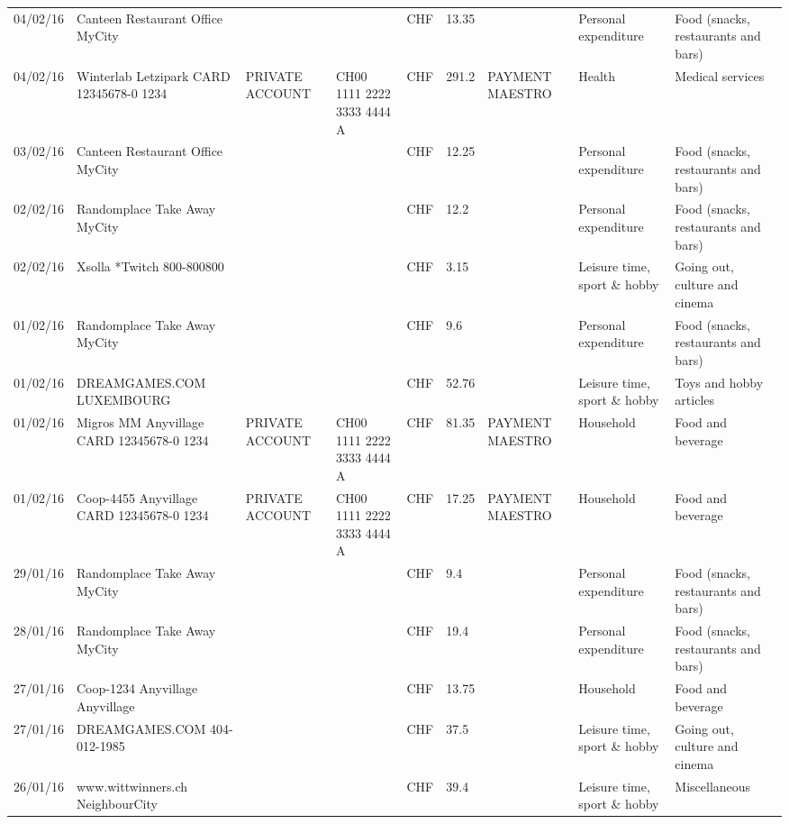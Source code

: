 \begin{landscape}
\begin{adjustwidth}{-2cm}{-2cm}
\begin{tiny}
\begin{longtable}{lp{4cm}llllp{3cm}ll}
		04/02/16 & Canteen Restaurant Office      MyCity &       &       & CHF   & 13.35 &       & Personal expenditure & Food (snacks, restaurants and bars) \\
		04/02/16 & Winterlab Letzipark CARD 12345678-0 1234 & PRIVATE ACCOUNT & CH00 1111 2222 3333 4444 A & CHF   & 291.2 & PAYMENT MAESTRO & Health & Medical services  \\
		03/02/16 & Canteen Restaurant Office      MyCity &       &       & CHF   & 12.25 &       & Personal expenditure & Food (snacks, restaurants and bars) \\
		02/02/16 & Randomplace Take Away     MyCity &       &       & CHF   & 12.2  &       & Personal expenditure & Food (snacks, restaurants and bars) \\
		02/02/16 & Xsolla *Twitch           800-800800 &       &       & CHF   & 3.15  &       & Leisure time, sport \& hobby & Going out, culture and cinema \\
		01/02/16 & Randomplace Take Away     MyCity &       &       & CHF   & 9.6   &       & Personal expenditure & Food (snacks, restaurants and bars) \\
		01/02/16 & DREAMGAMES.COM           LUXEMBOURG &       &       & CHF   & 52.76 &       & Leisure time, sport \& hobby & Toys and hobby articles \\
		01/02/16 & Migros MM Anyvillage CARD 12345678-0 1234 & PRIVATE ACCOUNT & CH00 1111 2222 3333 4444 A & CHF   & 81.35 & PAYMENT MAESTRO & Household & Food and beverage \\
		01/02/16 & Coop-4455 Anyvillage CARD 12345678-0 1234 & PRIVATE ACCOUNT & CH00 1111 2222 3333 4444 A & CHF   & 17.25 & PAYMENT MAESTRO & Household & Food and beverage \\
		29/01/16 & Randomplace Take Away     MyCity &       &       & CHF   & 9.4   &       & Personal expenditure & Food (snacks, restaurants and bars) \\
		28/01/16 & Randomplace Take Away     MyCity &       &       & CHF   & 19.4  &       & Personal expenditure & Food (snacks, restaurants and bars) \\
		27/01/16 & Coop-1234 Anyvillage    Anyvillage &       &       & CHF   & 13.75 &       & Household & Food and beverage \\
		27/01/16 & DREAMGAMES.COM           404-012-1985 &       &       & CHF   & 37.5  &       & Leisure time, sport \& hobby & Going out, culture and cinema \\
		26/01/16 & www.wittwinners.ch        NeighbourCity &       &       & CHF   & 39.4  &       & Leisure time, sport \& hobby & Miscellaneous \\

\end{longtable}
\end{tiny}
\end{adjustwidth}
\end{landscape}
